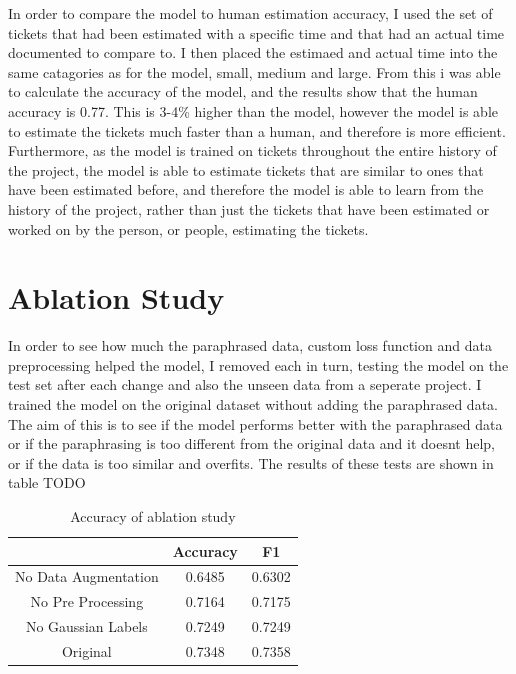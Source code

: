 \documentclass{UoYCSproject}
\begin{document}
    In order to compare the model to human estimation accuracy, I used the set of tickets that had been estimated with a specific time and that had an actual time documented to compare to.
    I then placed the estimaed and actual time into the same catagories as for the model, small, medium and large.
    From this i was able to calculate the accuracy of the model, and the results show that the human accuracy is 0.77.
    This is 3-4\% higher than the model, however the model is able to estimate the tickets much faster than a human, and therefore is more efficient.
    Furthermore, as the model is trained on tickets throughout the entire history of the project, the model is able to estimate tickets that are similar to ones that have been estimated before, and therefore the model is able to learn from the history of the project, rather than just the tickets that have been estimated or worked on by the person, or people, estimating the tickets.


    \section{Ablation Study}
    In order to see how much the paraphrased data, custom loss function and data preprocessing helped the model, I removed each in turn, testing the model on the test set after each change and also the unseen data from a seperate project.
    I trained the model on the original dataset without adding the paraphrased data. The aim of this is to see if the model performs better with the paraphrased data or if the paraphrasing is too different from the original data and it doesnt help, or if the data is too similar and overfits.
    The results of these tests are shown in table TODO \par

\begin{table}[]
\centering
\begin{tabular}{ccc}
    \toprule

                     & Accuracy   & F1         \\
    \midrule
No Data Augmentation & 0.6485 & 0.6302 \\
No Pre Processing    & 0.7164 & 0.7175 \\
No Gaussian Labels   & 0.7249 & 0.7249 \\
Original             & 0.7348  & 0.7358 \\
    \bottomrule
\end{tabular}
    \caption{Accuracy of ablation study} \label{tab:accuracy-ablation}

\end{table}
\end{document}
